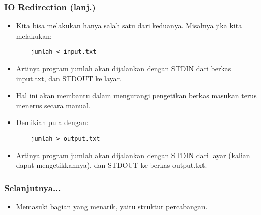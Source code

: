 \begin{frame}[fragile]
\frametitle{IO Redirection (lanj.)}
\begin{itemize}
  \item Kita bisa melakukan hanya salah satu dari keduanya. Misalnya jika kita melakukan:
  \begin{lstlisting}
    jumlah < input.txt
  \end{lstlisting}
  \item Artinya program jumlah akan dijalankan dengan STDIN dari berkas input.txt, dan STDOUT ke layar.
  \item Hal ini akan membantu dalam mengurangi pengetikan berkas masukan terus menerus secara manual.
  \item Demikian pula dengan:
  \begin{lstlisting}
    jumlah > output.txt
  \end{lstlisting}
  \item Artinya program jumlah akan dijalankan dengan STDIN dari layar (kalian dapat mengetikkannya), dan STDOUT ke berkas output.txt.
  \end{itemize}
\end{frame}

\begin{frame}
\frametitle{Selanjutnya...}
\begin{itemize}
  \item Memasuki bagian yang menarik, yaitu struktur percabangan.
\end{itemize}
\end{frame}



